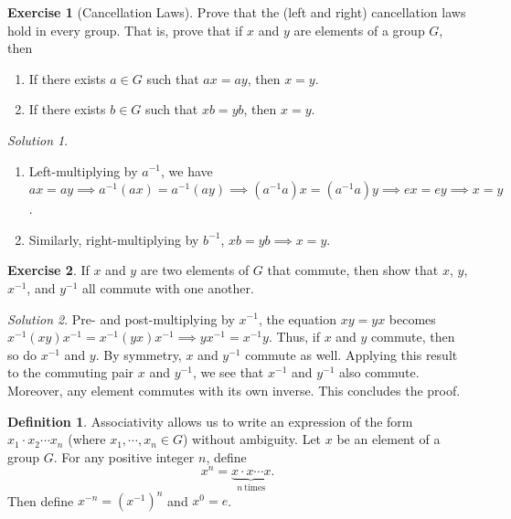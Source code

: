 \documentclass[svgnames]{article}
\theoremstyle{definition}
\newtheorem{Definition}[Definition]{Definition}
\newtheorem{Exercise}{Exercise}[section]
\theoremstyle{remark}
\newtheorem*{Solution*}{Solution}
\begin{document}
\begin{Exercise}[Cancellation Laws]
Prove that the (left and right) cancellation laws hold in every group. That is, prove that if $x$ and $y$ are elements of a group $G$, then
\begin{enumerate}
\item If there exists $a \in G$ such that $ax = ay$, then $x = y$.
\item If there exists $b \in G$ such that $xb = yb$, then $x = y$.
\end{enumerate}
\begin{Solution*}
\begin{enumerate}
\item Left-multiplying by $a^{-1}$, we have $ax = ay \implies a^{-1}(ax) = a^{-1}(ay) \implies (a^{-1}a)x = (a^{-1}a)y \implies ex = ey \implies x = y$.
\item Similarly, right-multiplying by $b^{-1}$, $xb = yb \implies x = y$.
\end{enumerate}
\end{Solution*}
\end{Exercise}

\begin{Exercise}
If $x$ and $y$ are two elements of $G$ that commute, then show that $x$, $y$, $x^{-1}$, and $y^{-1}$ all commute with one another.

\begin{Solution*}
Pre- and post-multiplying by $x^{-1}$, the equation $xy = yx$ becomes $x^{-1}(xy)x^{-1} = x^{-1}(yx)x^{-1} \implies yx^{-1} = x^{-1}y$. Thus, if $x$ and $y$ commute, then so do $x^{-1}$ and $y$. By symmetry, $x$ and $y^{-1}$ commute as well. Applying this result to the commuting pair $x$ and $y^{-1}$, we see that $x^{-1}$ and $y^{-1}$ also commute. Moreover, any element commutes with its own inverse. This concludes the proof.
\end{Solution*}
\end{Exercise}

\begin{Definition}\label{def:Power}
Associativity allows us to write an expression of the form $x_1 \cdot x_2 \cdots x_n$ (where $x_1, \cdots, x_n \in G$) without ambiguity. Let $x$ be an element of a group $G$. For any positive integer $n$, define
\begin{equation*}
x^n = \underbrace{x \cdot x \cdots x}_{n\ \text{times}}.
\end{equation*}
Then define $x^{-n} = (x^{-1})^n$ and $x^0 = e$.
\end{Definition}
\end{document}
